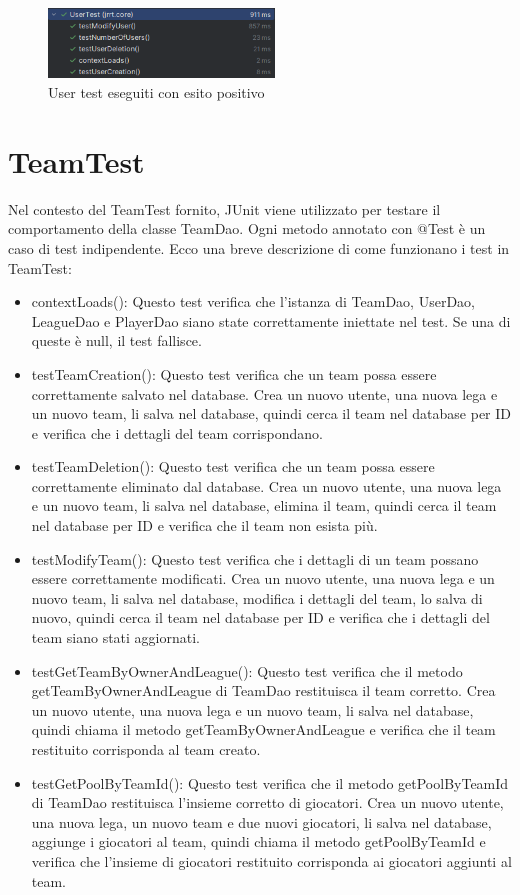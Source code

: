 \documentclass[twoside,openright,titlepage,fleqn,headinclude,12pt,a4paper,BCOR=5mm,footinclude]{scrbook}
\begin{document}
\begin{figure}[H]
  \centering
  \includegraphics[width=60mm]{images/userTest.png}
  \caption{User test eseguiti con esito positivo}
  \label{fig:userTests}
\end{figure}

\section{TeamTest} 
Nel contesto del TeamTest fornito, JUnit viene utilizzato per testare il comportamento della classe TeamDao. Ogni metodo annotato con @Test è un caso di test indipendente. Ecco una breve descrizione di come funzionano i test in TeamTest:  
\begin{itemize}
    \item contextLoads(): Questo test verifica che l'istanza di TeamDao, UserDao, LeagueDao e PlayerDao siano state correttamente iniettate nel test. Se una di queste è null, il test fallisce. \item testTeamCreation(): Questo test verifica che un team possa essere correttamente salvato nel database. Crea un nuovo utente, una nuova lega e un nuovo team, li salva nel database, quindi cerca il team nel database per ID e verifica che i dettagli del team corrispondano. 
    \item testTeamDeletion(): Questo test verifica che un team possa essere correttamente eliminato dal database. Crea un nuovo utente, una nuova lega e un nuovo team, li salva nel database, elimina il team, quindi cerca il team nel database per ID e verifica che il team non esista più. 
    \item testModifyTeam(): Questo test verifica che i dettagli di un team possano essere correttamente modificati. Crea un nuovo utente, una nuova lega e un nuovo team, li salva nel database, modifica i dettagli del team, lo salva di nuovo, quindi cerca il team nel database per ID e verifica che i dettagli del team siano stati aggiornati. 
    \item testGetTeamByOwnerAndLeague(): Questo test verifica che il metodo getTeamByOwnerAndLeague di TeamDao restituisca il team corretto. Crea un nuovo utente, una nuova lega e un nuovo team, li salva nel database, quindi chiama il metodo getTeamByOwnerAndLeague e verifica che il team restituito corrisponda al team creato. 
    \item testGetPoolByTeamId(): Questo test verifica che il metodo getPoolByTeamId di TeamDao restituisca l'insieme corretto di giocatori. Crea un nuovo utente, una nuova lega, un nuovo team e due nuovi giocatori, li salva nel database, aggiunge i giocatori al team, quindi chiama il metodo getPoolByTeamId e verifica che l'insieme di giocatori restituito corrisponda ai giocatori aggiunti al team. 
\end{itemize}  
\end{document}
